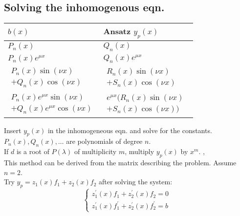 \subsection{Solving the inhomogenous eqn.}
\Procedure[Ansatz]
\begin{table}[H]
  \begin{center}
    \begin{tabular}{l|l}
      $b(x)$ & Ansatz $y_p(x)$ \\
      \hline
      
      $P_n(x)$ & $Q_n(x)$ \\
      $P_n(x)e^{\mu x}$ & $Q_n(x)e^{\mu x}$\\
      \hline
      
      $\begin{matrix}
      P_n(x) \sin(\nu x) \\ + 
      Q_n(x)\cos(\nu x)
      \end{matrix}$ 
      & $\begin{matrix}R_n(x)\sin(\nu x)\qquad\\ 
      + S_n(x)\cos(\nu x)\end{matrix}$ \\
      \hline
      
      $\begin{matrix}P_n(x)e^{\mu x}\sin(\nu x) \\
       + Q_n(x)e^{\mu x}\cos(\nu x)\end{matrix} $
      & $\begin{matrix}e^{\mu x}(R_n(x)\sin(\nu x) \\ + S_n(x)\cos(\nu x))\end{matrix}$
    \end{tabular}
  \end{center}
\end{table}
Insert $y_p(x)$ in the inhomogeneous eqn. and solve for the constants. $P_n(x), Q_n(x), \dots$ are polynomials of degree $n$. \\
\Remark If $d$ is a root of $P(\lambda)$ of multiplicity $m$, multiply $y_p(x)$ by $x^m$.
\sep
{} \\
This method can be derived from the matrix describing the problem. Assume $n=2$. \\
Try $y_p = z_{1}(x) f_{1}+z_{2}(x)f_{2}$ after solving the system:
$$
\left\{\begin{array}{l}
z_{1}^{\prime}(x) f_{1}+z_{2}^{\prime}(x) f_{2}=0 \\
z_{1}^{\prime}(x) f_{1}^{\prime}+z_{2}^{\prime}(x) f_{2}^{\prime}=b
\end{array}\right.
$$